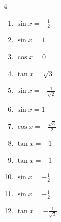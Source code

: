 \begin{multicols}{4}
\begin{enumerate}
  \item $\displaystyle \sin{x}  = -\frac{1}{2}$


\columnbreak %

  \item $\displaystyle \sin{x}  = 1$


  \item $\displaystyle \cos{x}  = 0$


  \item $\displaystyle \tan{x}  = \sqrt{3}$


  \item $\displaystyle \sin{x}  = -\frac{1}{\sqrt{2}}$


  \item $\displaystyle \sin{x}  = 1$


  \item $\displaystyle \cos{x}  = -\frac{\sqrt{3}}{2}$


  \item $\displaystyle \tan{x}  = -1$


  \item $\displaystyle \tan{x}  = -1$


  \item $\displaystyle \sin{x}  = -\frac{1}{2}$


  \item $\displaystyle \sin{x}  = -\frac{1}{2}$


  \item $\displaystyle \tan{x}  = -\frac{1}{\sqrt{3}}$


\end{enumerate}
\end{multicols}
